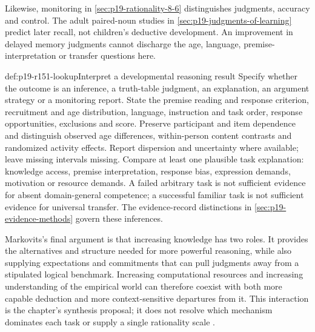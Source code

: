 Likewise, monitoring in \cref{sec:p19-rationality-8-6} distinguishes judgments,
accuracy and control. The adult paired-noun studies in
\cref{sec:p19-judgments-of-learning} predict later recall, not children's
deductive development. An improvement in delayed memory judgments cannot
discharge the age, language, premise-interpretation or transfer questions here.

\begin{hbmethod}{def:p19-r151-lookup}{Interpret a developmental reasoning result}
Specify whether the outcome is an inference, a truth-table judgment, an
explanation, an argument strategy or a monitoring report. State the premise
reading and response criterion, recruitment and age distribution, language,
instruction and task order, response opportunities, exclusions and score.
Preserve participant and item dependence and distinguish observed age
differences, within-person content contrasts and randomized activity effects.
Report dispersion and uncertainty where available; leave missing intervals
missing. Compare at least one plausible task explanation: knowledge access,
premise interpretation, response bias, expression demands, motivation or
resource demands. A failed arbitrary task is not sufficient evidence for
absent domain-general competence; a successful familiar task is not sufficient
evidence for universal transfer. The evidence-record distinctions in
\cref{sec:p19-evidence-methods} govern these inferences.
\end{hbmethod}

Markovits's final argument is that increasing knowledge has two roles.
It provides the alternatives and structure needed for more powerful reasoning,
while also supplying expectations and commitments that can pull judgments away
from a stipulated logical benchmark. Increasing computational resources and
increasing understanding of the empirical world can therefore coexist with
both more capable deduction and more context-sensitive departures from it.
This interaction is the chapter's synthesis proposal; it does not resolve
which mechanism dominates each task or supply a single rationality scale
\cite[p.~787]{Markovits2021DevelopmentRationality}.

